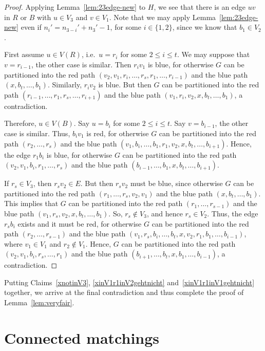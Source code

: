 \documentclass[a4paper,10pt]{article}
\begin{document}
\begin{proof}
Applying Lemma~\ref{lem:23edge-new} to $H$, we see that there is an edge $uv$ in $R$ or $B$ with $u \in V_3$ and $v \in V_1$.
Note that we may apply Lemma~\ref{lem:23edge-new} even if $n_i'=n_{3-i}'+n_3'-1$, for some $i \in \{1,2\}$, since we know that $b_1 \in V_2$.

First assume ${u \in V(R)}$, i.e.~$u = r_i$ for some $2 \le i \le t$.
We may suppose that $v = r_{i-1}$, the other case is similar.
Then $r_iv_1$ is blue, for otherwise $G$ can be partitioned into the red path $(v_2,v_1,r_i,\ldots,r_s,r_1,\ldots,r_{i-1})$ and the blue path $(x,b_t,\ldots,b_1)$.
Similarly, $r_iv_2$ is blue.
But then $G$ can be partitioned into the red path $(r_{i-1},\ldots,r_1,r_s,\ldots,r_{i+1})$ and the blue path $(v_1,r_i,v_2,x,b_t,\ldots,b_1)$, a contradiction.

Therefore,  ${u \in V(B)}$.
Say $u = b_i$ for some $2 \le i \le t$.
Say $v = b_{i-1}$, the other case is similar.
Thus, $b_iv_1$ is red, for otherwise $G$ can be partitioned into the red path $(r_2,\ldots,r_s)$ and the blue path $(v_1,b_i,\ldots,b_1,r_1,v_2,x,b_t,\ldots,b_{i+1})$.
Hence, the edge $r_1b_i$ is blue, for otherwise $G$ can be partitioned into the red path $(v_2,v_1,b_i,r_1,\ldots,r_s)$ and the blue path $(b_{i-1},\ldots,b_1,x,b_t,\ldots,b_{i+1})$.

If $r_s \in V_3$, then $r_sv_2 \in E$.
But then $r_sv_2$ must be blue, since otherwise $G$ can be partitioned into the red path $(r_1,\ldots,r_s,v_2,v_1)$ and the blue path $(x,b_t,\ldots,b_1)$.
This implies that $G$ can be partitioned into the red path $(r_1,\ldots,r_{s-1})$ and the blue path $(v_1,r_s,v_2,x,b_t,\ldots,b_1)$.
So, $r_s \notin V_3$, and hence $r_s \in V_2$.
Thus, the edge $r_sb_i$ exists and it must be red, for otherwise $G$ can be partitioned into the red path $(r_2,\ldots,r_{s-1})$ and the blue path $(v_1,r_s,b_i,\ldots,b_t,x,v_2,r_1,b_1,\ldots,b_{i-1})$, where $v_1 \in V_1$ and $r_2 \notin V_1$.
Hence, $G$ can be partitioned into the red path $(v_2,v_1,b_i,r_s,\ldots,r_1)$ and the blue path $(b_{i+1},\ldots,b_t,x,b_1,\ldots,b_{i-1})$, a contradiction.
\end{proof}

Putting Claims~\ref{xnotinV3}, \ref{xinV1r1inV2gehtnicht} and~\ref{xinV1r1inV1gehtnicht} together, we arrive at the final contradiction and thus 
complete the proof of Lemma~\ref{lem:veryfair}.

\section{Connected matchings}\label{sec:matchings}
\end{document}
